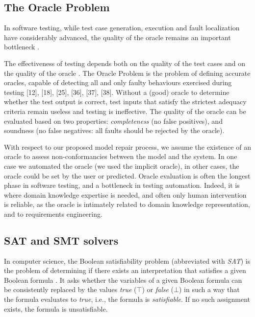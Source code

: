 \subsection{The Oracle Problem}

In software testing, while test case generation, execution and fault localization have considerably advanced, the quality of the oracle remains an important bottleneck \cite{jahangirova_empirical_2019}.

The effectiveness of testing depends both on the quality of the test cases and on the quality of the oracle \cite{barr_oracle_2015,staats_programs_2011,weyuker_testing_1982}. 
The Oracle Problem is the problem of defining accurate oracles, capable of detecting all and only faulty behaviours exercised during testing [12], [18], [25], [36], [37], [38]. Without a (good) oracle to determine whether the test output is correct, test inputs that satisfy the strictest adequacy criteria remain useless and testing is ineffective.
The quality of the oracle can be evaluated based on two properties: \textit{completeness} (no false positives), and soundness (no false negatives: all faults should be rejected by the oracle).



With respect to our proposed model repair process, we assume the existence of an oracle to assess non-conformancies between the model and the system.
In one case we automated the oracle (we used the implicit oracle), in other cases, the oracle could be set by the user or predicted.
Oracle evaluation is often the longest phase in software testing, and a bottleneck in testing automation. Indeed, it is where domain knowledge expertise is needed, and often only human intervention is reliable, as the oracle is intimately related to domain knowledge representation, and to requirements engineering.

\subsection{SAT and SMT solvers}

In computer science, the Boolean satisfiability problem (abbreviated with \textit{SAT}) is the problem of determining if there exists an interpretation that satisfies a given Boolean formula \cite{biere1999symbolic}. 
It asks whether the variables of a given Boolean formula can be consistently replaced by the values \textit{true} ($\top$) or \textit{false} ($\bot$) in such a way that the formula evaluates to \textit{true}, i.e., the formula is \textit{satisfiable}. 
If no such assignment exists, the formula is unsatisfiable.

